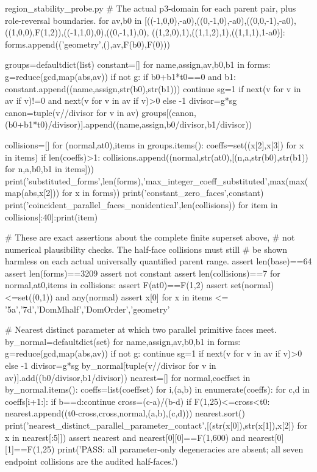 \begin{filecontents*}[overwrite]{region_stability_probe.py}
# The actual p3-domain for each parent pair, plus role-reversal boundaries.
for av,b0 in [((-1,0,0),-a0),((0,-1,0),-a0),((0,0,-1),-a0),
              ((1,0,0),F(1,2)),((-1,1,0),0),((0,-1,1),0),
              ((1,2,0),1),((1,1,2),1),((1,1,1),1-a0)]:
    forms.append(('geometry',(),av,F(b0),F(0)))

groups=defaultdict(list)
constant=[]
for name,assign,av,b0,b1 in forms:
    g=reduce(gcd,map(abs,av))
    if not g:
        if b0+b1*t0==0 and b1:
            constant.append((name,assign,str(b0),str(b1)))
        continue
    sg=1 if next(v for v in av if v)!=0 and next(v for v in av if v)>0 else -1
    divisor=g*sg
    canon=tuple(v//divisor for v in av)
    groups[(canon,(b0+b1*t0)/divisor)].append((name,assign,b0/divisor,b1/divisor))

collisions=[]
for (normal,at0),items in groups.items():
    coeffs=set((x[2],x[3]) for x in items)
    if len(coeffs)>1:
        collisions.append((normal,str(at0),[(n,a,str(b0),str(b1)) for n,a,b0,b1 in items]))
print('substituted_forms',len(forms),'max_integer_coeff_substituted',max(max(map(abs,x[2])) for x in forms))
print('constant_zero_faces',constant)
print('coincident_parallel_faces_nonidentical',len(collisions))
for item in collisions[:40]:print(item)

# These are exact assertions about the complete finite superset above,
# not numerical plausibility checks. The half-face collisions must still
# be shown harmless on each actual universally quantified parent range.
assert len(base)==64
assert len(forms)==3209
assert not constant
assert len(collisions)==7
for normal,at0,items in collisions:
    assert F(at0)==F(1,2)
    assert set(normal)<=set((0,1)) and any(normal)
    assert {x[0] for x in items} <= {'5a','7d','DomMhalf','DomOrder','geometry'}

# Nearest distinct parameter at which two parallel primitive faces meet.
by_normal=defaultdict(set)
for name,assign,av,b0,b1 in forms:
    g=reduce(gcd,map(abs,av))
    if not g: continue
    sg=1 if next(v for v in av if v)>0 else -1
    divisor=g*sg
    by_normal[tuple(v//divisor for v in av)].add((b0/divisor,b1/divisor))
nearest=[]
for normal,coeffset in by_normal.items():
    coeffs=list(coeffset)
    for i,(a,b) in enumerate(coeffs):
        for c,d in coeffs[i+1:]:
            if b==d:continue
            cross=(c-a)/(b-d)
            if F(1,25)<=cross<t0:
                nearest.append((t0-cross,cross,normal,(a,b),(c,d)))
nearest.sort()
print('nearest_distinct_parallel_parameter_contact',[(str(x[0]),str(x[1]),x[2]) for x in nearest[:5]])
assert nearest and nearest[0][0]==F(1,600) and nearest[0][1]==F(1,25)
print('PASS: all parameter-only degeneracies are absent; all seven endpoint collisions are the audited half-faces.')
\end{filecontents*}
